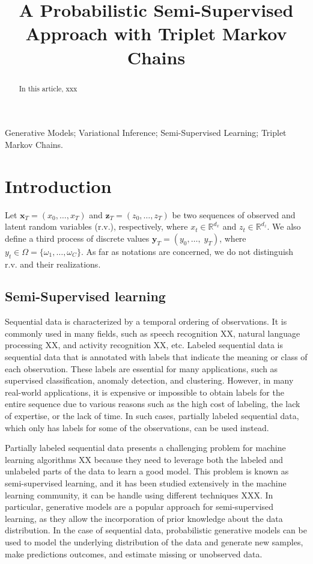 \documentclass{article}
\title{A Probabilistic Semi-Supervised Approach with Triplet Markov Chains}
\def\x{{\mathbf x}}
\def\z{{\mathbf z}}
\def\y{{\mathbf y}}
\begin{document}

\maketitle

\begin{abstract}
In this article, xxx
\end{abstract}
%
\begin{keywords}
Generative Models; Variational Inference; Semi-Supervised Learning; Triplet Markov Chains.
\end{keywords}
%
\section{Introduction}
\label{sec:intro}
Let $\x_T=(x_{0}, \dots, x_{T})$ and $\z_T=(z_{0}, \dots, z_{T})$  be two
sequences of observed and latent  random variables (r.v.), respectively, 
where  $x_t \in \mathbb{R}^{d_x}$ and $z_t \in \mathbb{R}^{d_z}$. 
We also define a  third process of discrete values $\y_T=(y_{0}, \dots,\; y_{T})$, 
where $y_t \in \Omega=\{\omega_1,\dots,\omega_C\}$.
As far as notations are concerned, we do not distinguish r.v. and their realizations.

\subsection{Semi-Supervised learning}
Sequential data is characterized by a temporal ordering of observations. 
It is commonly used in many fields, such as speech recognition XX, 
natural language processing XX, and activity recognition XX, etc. 
Labeled sequential data is sequential data that is annotated with labels
that indicate the meaning or class of each observation.
These labels are essential for many applications, such as supervised classification, 
anomaly detection, and clustering.
However, in many real-world applications, it is expensive or impossible to obtain
labels for the entire sequence due to various reasons such as the high cost of
labeling, the lack of expertise, or the lack of time. 
In such cases, partially labeled sequential data, which only has labels 
for some of the observations, can be used instead.


Partially labeled sequential data presents a challenging problem for machine 
learning algorithms XX because they need to leverage both the labeled and 
unlabeled parts of the data to learn a good model. 
This problem is known as semi-supervised learning, and it has been studied 
extensively in the machine learning community,  it can be handle using
different techniques XXX.
In particular, generative models are a popular approach for semi-supervised learning, 
as they allow the incorporation of prior knowledge about the data distribution.
In the case of sequential data, probabilistic generative models can be used to
model the underlying distribution of the data and generate new samples,
make predictions outcomes, and estimate missing or unobserved data. 
\end{document}
